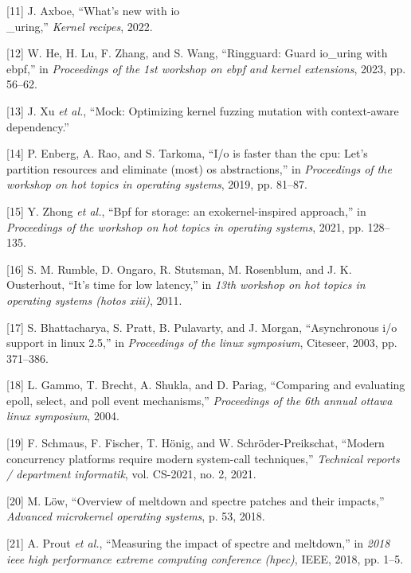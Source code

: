 \documentclass[conference]{IEEEtran}{}
\begin{document}
\begin{hangparas}{1.5em}{1}
\hypertarget{citeproc_bib_item_11}{[11] J. Axboe, “What’s new with io\\_uring,” \textit{Kernel recipes}, 2022.}

\hypertarget{citeproc_bib_item_12}{[12] W. He, H. Lu, F. Zhang, and S. Wang, “Ringguard: Guard io\_uring with ebpf,” in \textit{Proceedings of the 1st workshop on ebpf and kernel extensions}, 2023, pp. 56–62.}

\hypertarget{citeproc_bib_item_13}{[13] J. Xu \textit{et al.}, “Mock: Optimizing kernel fuzzing mutation with context-aware dependency.”}

\hypertarget{citeproc_bib_item_14}{[14] P. Enberg, A. Rao, and S. Tarkoma, “I/o is faster than the cpu: Let’s partition resources and eliminate (most) os abstractions,” in \textit{Proceedings of the workshop on hot topics in operating systems}, 2019, pp. 81–87.}

\hypertarget{citeproc_bib_item_15}{[15] Y. Zhong \textit{et al.}, “Bpf for storage: an exokernel-inspired approach,” in \textit{Proceedings of the workshop on hot topics in operating systems}, 2021, pp. 128–135.}

\hypertarget{citeproc_bib_item_16}{[16] S. M. Rumble, D. Ongaro, R. Stutsman, M. Rosenblum, and J. K. Ousterhout, “It’s time for low latency,” in \textit{13th workshop on hot topics in operating systems (hotos xiii)}, 2011.}

\hypertarget{citeproc_bib_item_17}{[17] S. Bhattacharya, S. Pratt, B. Pulavarty, and J. Morgan, “Asynchronous i/o support in linux 2.5,” in \textit{Proceedings of the linux symposium}, Citeseer, 2003, pp. 371–386.}

\hypertarget{citeproc_bib_item_18}{[18] L. Gammo, T. Brecht, A. Shukla, and D. Pariag, “Comparing and evaluating epoll, select, and poll event mechanisms,” \textit{Proceedings of the 6th annual ottawa linux symposium}, 2004.}

\hypertarget{citeproc_bib_item_19}{[19] F. Schmaus, F. Fischer, T. Hönig, and W. Schröder-Preikschat, “Modern concurrency platforms require modern system-call techniques,” \textit{Technical reports / department informatik}, vol. CS-2021, no. 2, 2021.}

\hypertarget{citeproc_bib_item_20}{[20] M. Löw, “Overview of meltdown and spectre patches and their impacts,” \textit{Advanced microkernel operating systems}, p. 53, 2018.}

\hypertarget{citeproc_bib_item_21}{[21] A. Prout \textit{et al.}, “Measuring the impact of spectre and meltdown,” in \textit{2018 ieee high performance extreme computing conference (hpec)}, IEEE, 2018, pp. 1–5.}


\end{hangparas}
\end{document}

